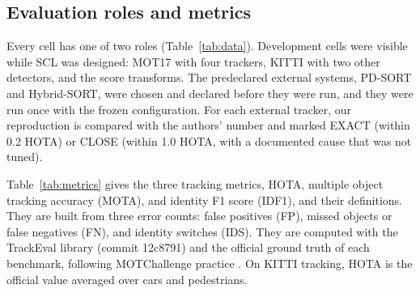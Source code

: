 \documentclass[pdflatex,sn-mathphys-num,iicol]{sn-jnl}
\newcommand{\scl}{SCL}
\begin{document}
\subsection{Evaluation roles and metrics}\label{sec:roles}
Every cell has one of two roles (Table~\ref{tab:data}). Development cells
were visible while \scl{} was designed: MOT17 with four trackers, KITTI with
two other detectors, and the score transforms. The predeclared external systems,
PD-SORT and Hybrid-SORT, were chosen and declared before they were run, and
they were run once with the frozen configuration. For each external tracker,
our reproduction is compared with the authors' number and marked EXACT
(within 0.2 HOTA) or CLOSE (within 1.0 HOTA, with a documented cause that was
not tuned).

\label{sec:metrics}Table~\ref{tab:metrics} gives the three tracking metrics,
HOTA, multiple object tracking accuracy (MOTA), and identity F1 score (IDF1),
and their definitions. They are built from three error counts: false
positives (FP), missed objects or false negatives (FN), and identity switches
(IDS). They are computed with the TrackEval library (commit
12c8791) and the official ground truth of each benchmark, following
MOTChallenge practice \cite{dendorfer2021motchallenge}. On KITTI tracking,
HOTA is the official value averaged over cars and pedestrians.
\end{document}
